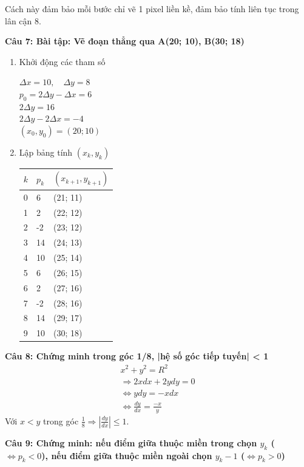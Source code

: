 Cách này đảm bảo mỗi bước chỉ vẽ 1 pixel liền kề, đảm bảo tính liên tục trong lân cận 8.

\textbf{Câu 7: Bài tập: Vẽ đoạn thẳng qua A(20; 10), B(30; 18)}

\begin{enumerate}
	\item Khởi động các tham số
	
	$\Delta x = 10, \quad \Delta y = 8$ \\
	$p_0 = 2 \Delta y - \Delta x = 6$\\
	$2 \Delta y = 16$\\
	$2 \Delta y - 2 \Delta x = -4$\\
	$(x_0, y_0) = (20; 10)$
	
	\item Lập bảng tính $(x_k, y_k)$
	
	\begin{table}[H]
		\centering
		\begin{tabular}{|l|l|l|}
			\hline
			$k$ & $p_k$ & $(x_{k+1}, y_{k+1})$ \\ \hline
			0 & 6 & (21; 11) \\ \hline
			1 & 2 & (22; 12) \\ \hline
			2 & -2 & (23; 12) \\ \hline
			3 & 14 & (24; 13) \\ \hline
			4 & 10 & (25; 14) \\ \hline
			5 & 6 & (26; 15) \\ \hline
			6 & 2 & (27; 16) \\ \hline
			7 & -2 & (28; 16) \\ \hline
			8 & 14 & (29; 17) \\ \hline
			9 & 10 & (30; 18) \\ \hline
		\end{tabular}
	\end{table}
\end{enumerate}

\textbf{Câu 8: Chứng minh trong góc 1/8, |hệ số góc tiếp tuyến| < 1}
\begin{gather*}
	x^2 + y^2 = R^2 \\
	\Rightarrow 2xdx + 2ydy = 0 \\
	\Leftrightarrow ydy = -xdx \\
	\Leftrightarrow \frac{dy}{dx} = \frac{-x}{y}
\end{gather*}
Với $x < y$ trong góc $\frac{1}{8} \Rightarrow |\frac{dy}{dx}| \le 1$.

\textbf{Câu 9: Chứng minh: nếu điểm giữa thuộc miền trong chọn $y_k$ ($\Leftrightarrow p_k < 0$), nếu điểm giữa thuộc miền ngoài chọn $y_k - 1$ ($\Leftrightarrow p_k > 0$)}

